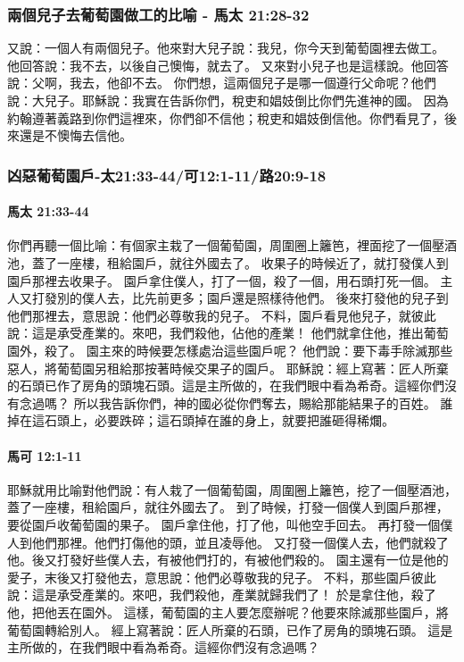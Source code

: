 \subsubsection{兩個兒子去葡萄園做工的比喻 - 馬太 21:28-32}
又說：一個人有兩個兒子。他來對大兒子說：我兒，你今天到葡萄園裡去做工。
他回答說：我不去，以後自己懊悔，就去了。
又來對小兒子也是這樣說。他回答說：父啊，我去，他卻不去。
你們想，這兩個兒子是哪一個遵行父命呢？他們說：大兒子。耶穌說：我實在告訴你們，稅吏和娼妓倒比你們先進神的國。
因為約翰遵著義路到你們這裡來，你們卻不信他；稅吏和娼妓倒信他。你們看見了，後來還是不懊悔去信他。

\subsubsection{凶惡葡萄園戶-太21:33-44/可12:1-11/路20:9-18}
\paragraph{馬太 21:33-44}

你們再聽一個比喻：有個家主栽了一個葡萄園，周圍圈上籬笆，裡面挖了一個壓酒池，蓋了一座樓，租給園戶，就往外國去了。
收果子的時候近了，就打發僕人到園戶那裡去收果子。
園戶拿住僕人，打了一個，殺了一個，用石頭打死一個。
主人又打發別的僕人去，比先前更多；園戶還是照樣待他們。
後來打發他的兒子到他們那裡去，意思說：他們必尊敬我的兒子。
不料，園戶看見他兒子，就彼此說：這是承受產業的。來吧，我們殺他，佔他的產業！
他們就拿住他，推出葡萄園外，殺了。
園主來的時候要怎樣處治這些園戶呢？
他們說：要下毒手除滅那些惡人，將葡萄園另租給那按著時候交果子的園戶。
耶穌說：經上寫著：匠人所棄的石頭已作了房角的頭塊石頭。這是主所做的，在我們眼中看為希奇。這經你們沒有念過嗎？
所以我告訴你們，神的國必從你們奪去，賜給那能結果子的百姓。
誰掉在這石頭上，必要跌碎；這石頭掉在誰的身上，就要把誰砸得稀爛。


\paragraph{馬可 12:1-11}
耶穌就用比喻對他們說：有人栽了一個葡萄園，周圍圈上籬笆，挖了一個壓酒池，蓋了一座樓，租給園戶，就往外國去了。
到了時候，打發一個僕人到園戶那裡，要從園戶收葡萄園的果子。
園戶拿住他，打了他，叫他空手回去。
再打發一個僕人到他們那裡。他們打傷他的頭，並且凌辱他。
又打發一個僕人去，他們就殺了他。後又打發好些僕人去，有被他們打的，有被他們殺的。
園主還有一位是他的愛子，末後又打發他去，意思說：他們必尊敬我的兒子。
不料，那些園戶彼此說：這是承受產業的。來吧，我們殺他，產業就歸我們了！
於是拿住他，殺了他，把他丟在園外。
這樣，葡萄園的主人要怎麼辦呢？他要來除滅那些園戶，將葡萄園轉給別人。
經上寫著說：匠人所棄的石頭，已作了房角的頭塊石頭。
這是主所做的，在我們眼中看為希奇。這經你們沒有念過嗎？

